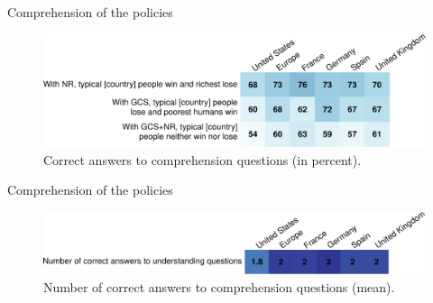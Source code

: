 \documentclass[aspectratio=169,xcolor=dvipsnames, 11pt,mathserif]{beamer}
\begin{document}
\begin{frame}{Comprehension of the policies}\label{understanding}
    \begin{figure}[h!]
        \caption[Comprehension]{Correct answers to comprehension questions (in percent). \hyperlink{gcs_support}{}}\label{fig:understood_each}
        \includegraphics[width=\textwidth]{../figures/country_comparison/understood_each_positive.pdf}
    \end{figure}    
\end{frame}

\begin{frame}{Comprehension of the policies}
\begin{figure}[h!]
    \caption[Comprehension score]{Number of correct answers to comprehension questions (mean). \hyperlink{gcs_support}{}}\label{fig:understood_score}
    \includegraphics[width=\textwidth]{../figures/country_comparison/understood_score_mean.pdf} 
\end{figure}
\end{frame}
\end{document}
